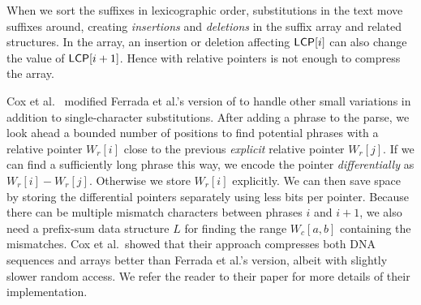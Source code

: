 When we sort the suffixes in lexicographic order, substitutions in the text move suffixes around, creating \emph{insertions} and \emph{deletions} in the suffix array and related structures. In the \LCP{} array, an insertion or deletion affecting $\mathsf{LCP}[i]$ can also change the value of $\mathsf{LCP}[i+1]$. Hence \RLZ{} with relative pointers is not enough to compress the \LCP{} array.

Cox et al.~\cite{CoxEtAl16} modified Ferrada et al.'s version of \RLZ{} to handle other small variations in addition to single-character substitutions. After adding a phrase to the parse, we look ahead a bounded number of positions to find potential phrases with a relative pointer $W_{r}[i]$ close to the previous \emph{explicit} relative pointer $W_{r}[j]$. If we can find a sufficiently long phrase this way, we encode the pointer \emph{differentially} as $W_{r}[i] - W_{r}[j]$. Otherwise we store $W_{r}[i]$ explicitly. We can then save space by storing the differential pointers separately using less bits per pointer. Because there can be multiple mismatch characters between phrases $i$ and $i+1$, we also need a prefix-sum data structure $L$ for finding the range $W_{c}[a,b]$ containing the mismatches. Cox et al.\ showed that their approach compresses both DNA sequences and \LCP{} arrays better than Ferrada et al.'s version, albeit with slightly slower random access. We refer the reader to their paper for more details of their implementation.
